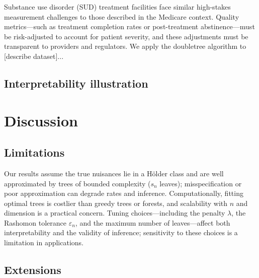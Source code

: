 \documentclass[12pt]{article}
\begin{document}
Substance use disorder (SUD) treatment facilities face similar high-stakes measurement challenges to those described in the Medicare context. Quality metrics---such as treatment completion rates or post-treatment abstinence---must be risk-adjusted to account for patient severity, and these adjustments must be transparent to providers and regulators. We apply the doubletree algorithm to [describe dataset]...


\subsection{Interpretability illustration}

\section{Discussion}
\label{sec:discussion}

\subsection{Limitations}
Our results assume the true nuisances lie in a H\"older class and are well approximated by trees of bounded complexity ($s_n$ leaves); misspecification or poor approximation can degrade rates and inference. Computationally, fitting optimal trees is costlier than greedy trees or forests, and scalability with $n$ and dimension is a practical concern. Tuning choices---including the penalty $\lambda$, the Rashomon tolerance $\varepsilon_n$, and the maximum number of leaves---affect both interpretability and the validity of inference; sensitivity to these choices is a limitation in applications.

\subsection{Extensions}
\end{document}
